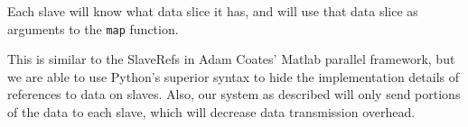 \documentclass[%
        final,
        notitlepage,
        narroweqnarray,
        inline,
        ]{ieee}
\begin{document}
Each slave will know what data slice it has, and will use that data slice as
arguments to the {\tt map} function.

This is similar to the SlaveRefs in Adam Coates' Matlab parallel framework, but
we are able to use Python's superior syntax to hide the implementation details
of references to data on slaves. Also, our system as described will only send
portions of the data to each slave, which will decrease data transmission
overhead.

%
%

%
%
%
%
%
%
%
%
%
%
%
%
%
%
%
%
\end{document}
